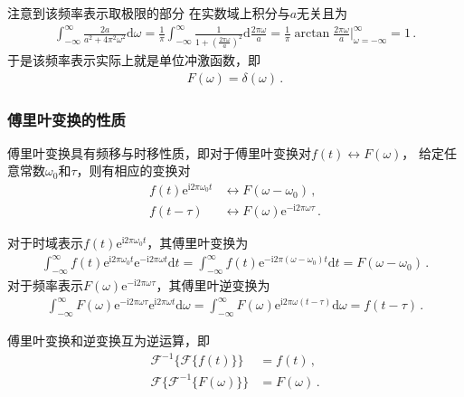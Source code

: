 注意到该频率表示取极限的部分
在实数域上积分与$a$无关且为
\begin{align}
    \int_{-\infty}^{\infty}\frac{2a}{a^2+4\pi^2\omega^2}\mathrm{d}\omega
    =\frac{1}{\pi}\int_{-\infty}^{\infty}\frac{1}{1+\left(\frac{2\pi\omega}{a}\right)^2}\mathrm{d}\frac{2\pi\omega}{a}
    =\frac{1}{\pi}\arctan\frac{2\pi\omega}{a}\bigg|_{\omega=-\infty}^{\infty}=1\, .
\end{align}
于是该频率表示实际上就是单位冲激函数，即
\begin{align}
    F(\omega)=\delta(\omega)\, .
\end{align}

\subsubsection*{傅里叶变换的性质}
\begin{theorem}
    傅里叶变换具有频移与时移性质，即对于傅里叶变换对$f(t)\leftrightarrow F(\omega)$，
    给定任意常数$\omega_0$和$\tau$，则有相应的变换对
    \begin{align}
        f(t)\mathrm{e}^{\mathrm{i}2\pi\omega_0 t} & \leftrightarrow F(\omega-\omega_0)\, ,                              \\
        f(t-\tau)                                 & \leftrightarrow F(\omega)\mathrm{e}^{-\mathrm{i}2\pi\omega\tau}\, .
    \end{align}
\end{theorem}
\begin{prove}
    对于时域表示$f(t)\mathrm{e}^{\mathrm{i}2\pi\omega_0 t}$，其傅里叶变换为
    \begin{align}
        \int_{-\infty}^{\infty}f(t)\mathrm{e}^{\mathrm{i}2\pi\omega_0 t}\mathrm{e}^{-\mathrm{i}2\pi\omega t}\mathrm{d}t
        =\int_{-\infty}^{\infty}f(t)\mathrm{e}^{-\mathrm{i}2\pi(\omega-\omega_0) t}\mathrm{d}t=F(\omega-\omega_0)\, .
    \end{align}
    对于频率表示$F(\omega)\mathrm{e}^{-\mathrm{i}2\pi\omega\tau}$，其傅里叶逆变换为
    \begin{align}
        \int_{-\infty}^{\infty}F(\omega)\mathrm{e}^{-\mathrm{i}2\pi\omega\tau}\mathrm{e}^{\mathrm{i}2\pi\omega t}\mathrm{d}\omega
        =\int_{-\infty}^{\infty}F(\omega)\mathrm{e}^{\mathrm{i}2\pi\omega(t-\tau)}\mathrm{d}\omega
        =f(t-\tau)\, .
    \end{align}
\end{prove}
\begin{theorem}
    傅里叶变换和逆变换互为逆运算，即
    \begin{align}
        \mathcal{F}^{-1}\{\mathcal{F}\{f(t)\}\}      & =f(t)\, ,      \\
        \mathcal{F}\{\mathcal{F}^{-1}\{F(\omega)\}\} & =F(\omega)\, .
    \end{align}
\end{theorem}

